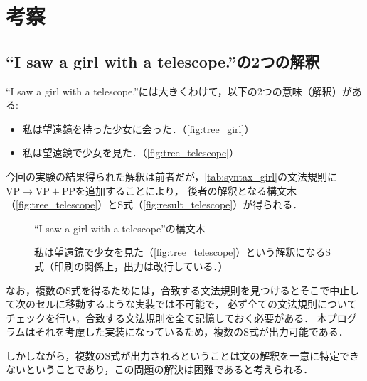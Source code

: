 \documentclass[uplatex, dvipdfmx, a4paper, twocolumn]{jsarticle}
\begin{document}
  \section{考察}\label{kousatu}
    \subsection{``I saw a girl with a telescope.''の2つの解釈}
    ``I saw a girl with a telescope.''には大きくわけて，以下の2つの意味（解釈）がある:
    \begin{itemize}
      \item 私は望遠鏡を持った少女に会った．（\autoref{fig:tree_girl}）
      \item 私は望遠鏡で少女を見た．（\autoref{fig:tree_telescope}）
    \end{itemize}
    今回の実験の結果得られた解釈は前者だが，\autoref{tab:syntax_girl}の文法規則に\(\text{VP} \to \text{VP} + \text{PP}\)を追加することにより，
    後者の解釈となる構文木（\autoref{fig:tree_telescope}）とS式（\autoref{fig:result_telescope}）が得られる．
    \begin{figure}[htpb]
      \centering
      \subfloat[私は望遠鏡を持った少女に会った．]{
        \label{fig:tree_girl}
        \resizebox{0.45\linewidth}{!}{
          
        }
      }
      \subfloat[私は望遠鏡で少女を見た．]{
        \label{fig:tree_telescope}
        \resizebox{0.45\linewidth}{!}{
          
        }
      }
      \caption{``I saw a girl with a telescope''の構文木}
    \end{figure}
    \begin{figure}[htpb]
      \centering
      \caption{私は望遠鏡で少女を見た（\autoref{fig:tree_telescope}）という解釈になるS式（印刷の関係上，出力は改行している．）}
      \label{fig:result_telescope}
    \end{figure}

    なお，複数のS式を得るためには，合致する文法規則を見つけるとそこで中止して次のセルに移動するような実装では不可能で，
    必ず全ての文法規則についてチェックを行い，合致する文法規則を全て記憶しておく必要がある．
    本プログラムはそれを考慮した実装になっているため，複数のS式が出力可能である．

    しかしながら，複数のS式が出力されるということは文の解釈を一意に特定できないということであり，この問題の解決は困難であると考えられる．
\end{document}
